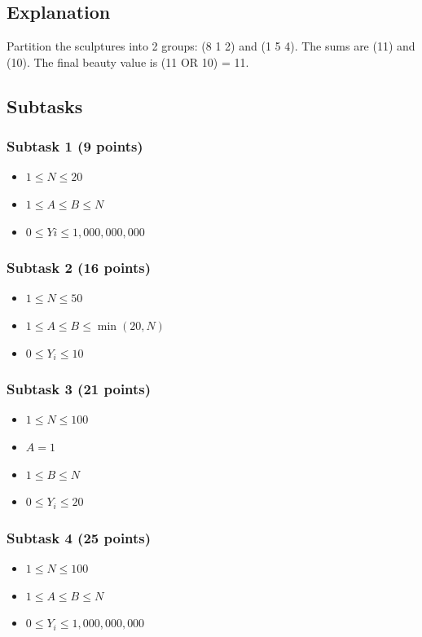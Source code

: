 \documentclass[a4paper]{article}
\begin{document}
\subsection*{Explanation}
Partition the sculptures into 2 groups: (8 1 2) and (1 5 4). The sums are (11) and (10). The final beauty value is (11 OR 10) = 11.

\subsection*{Subtasks}
\subsubsection*{Subtask 1 (9 points)}
\begin{itemize} \itemsep1pt \parskip0pt
\item $1 \le N \le 20$
\item $1 \le A \le B \le N$
\item $0 \le Yi \le 1,000,000,000$
\end{itemize}

\subsubsection*{Subtask 2 (16 points)}
\begin{itemize} \itemsep1pt \parskip0pt
\item $1 \le N \le 50$
\item $1 \le A \le B \le \min(20, N)$
\item $0 \le Y_i \le 10$
\end{itemize}

\subsubsection*{Subtask 3 (21 points)}
\begin{itemize} \itemsep1pt \parskip0pt
\item $1 \le N \le 100$
\item $A = 1$
\item $1 \le B \le N$
\item $0 \le Y_i \le 20$
\end{itemize}

\subsubsection*{Subtask 4 (25 points)}
\begin{itemize} \itemsep1pt \parskip0pt
\item $1 \le N \le 100$
\item $1 \le A \le B \le N$
\item $0 \le Y_i \le 1,000,000,000$
\end{itemize}
\end{document}
